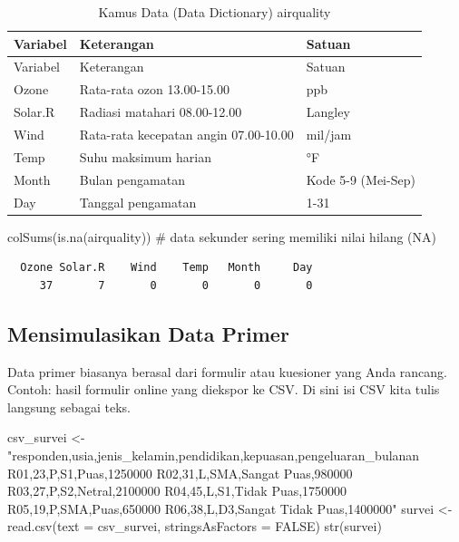 \documentclass[
  indonesian,
  letterpaper,
]{book}
\newenvironment{Shaded}{\begin{snugshade}}{\end{snugshade}}
\newcommand{\AttributeTok}[1]{\textcolor[rgb]{0.40,0.45,0.13}{#1}}
\newcommand{\CommentTok}[1]{\textcolor[rgb]{0.37,0.37,0.37}{#1}}
\newcommand{\ConstantTok}[1]{\textcolor[rgb]{0.56,0.35,0.01}{#1}}
\newcommand{\FunctionTok}[1]{\textcolor[rgb]{0.28,0.35,0.67}{#1}}
\newcommand{\NormalTok}[1]{\textcolor[rgb]{0.00,0.23,0.31}{#1}}
\newcommand{\OtherTok}[1]{\textcolor[rgb]{0.00,0.23,0.31}{#1}}
\newcommand{\StringTok}[1]{\textcolor[rgb]{0.13,0.47,0.30}{#1}}
\begin{document}
\begin{longtable}[]{@{}lll@{}}
\caption{Kamus Data (Data Dictionary) airquality}\tabularnewline
\toprule\noalign{}
Variabel & Keterangan & Satuan \\
\midrule\noalign{}
\endfirsthead
\toprule\noalign{}
Variabel & Keterangan & Satuan \\
\midrule\noalign{}
\endhead
\bottomrule\noalign{}
\endlastfoot
Ozone & Rata-rata ozon 13.00-15.00 & ppb \\
Solar.R & Radiasi matahari 08.00-12.00 & Langley \\
Wind & Rata-rata kecepatan angin 07.00-10.00 & mil/jam \\
Temp & Suhu maksimum harian & °F \\
Month & Bulan pengamatan & Kode 5-9 (Mei-Sep) \\
Day & Tanggal pengamatan & 1-31 \\
\end{longtable}

\begin{Shaded}
\begin{Highlighting}[]
\FunctionTok{colSums}\NormalTok{(}\FunctionTok{is.na}\NormalTok{(airquality)) }\CommentTok{\# data sekunder sering memiliki nilai hilang (NA)}
\end{Highlighting}
\end{Shaded}

\begin{verbatim}
  Ozone Solar.R    Wind    Temp   Month     Day 
     37       7       0       0       0       0 
\end{verbatim}

\subsection{Mensimulasikan Data
Primer}\label{mensimulasikan-data-primer}

Data primer biasanya berasal dari formulir atau kuesioner yang Anda
rancang. Contoh: hasil formulir online yang diekspor ke CSV. Di sini isi
CSV kita tulis langsung sebagai teks.

\begin{Shaded}
\begin{Highlighting}[]
\NormalTok{csv\_survei }\OtherTok{\textless{}{-}} \StringTok{"responden,usia,jenis\_kelamin,pendidikan,kepuasan,pengeluaran\_bulanan}
\StringTok{R01,23,P,S1,Puas,1250000}
\StringTok{R02,31,L,SMA,Sangat Puas,980000}
\StringTok{R03,27,P,S2,Netral,2100000}
\StringTok{R04,45,L,S1,Tidak Puas,1750000}
\StringTok{R05,19,P,SMA,Puas,650000}
\StringTok{R06,38,L,D3,Sangat Tidak Puas,1400000"}
\NormalTok{survei }\OtherTok{\textless{}{-}} \FunctionTok{read.csv}\NormalTok{(}\AttributeTok{text =}\NormalTok{ csv\_survei, }\AttributeTok{stringsAsFactors =} \ConstantTok{FALSE}\NormalTok{)}
\FunctionTok{str}\NormalTok{(survei)}
\end{Highlighting}
\end{Shaded}
\end{document}
